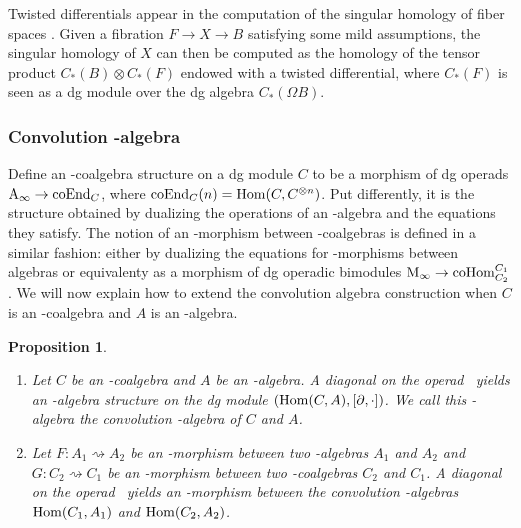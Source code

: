 \documentclass[twoside, 11pt]{amsart}
\newtheorem{proposition}[definition]{Proposition}
\theoremstyle{remark}
\begin{document}
Twisted differentials appear in the computation of the singular homology of fiber spaces \cite{Brown59}. 
Given a fibration $F \rightarrow X \rightarrow B$ satisfying some mild assumptions, the singular homology of $X$ can then be computed as the homology of the tensor product $C_*(B) \otimes C_*(F)$ endowed with a twisted differential, where $C_*(F)$ is seen as a dg module over the dg algebra $C_*(\Omega B)$.

\subsubsection{Convolution \Ainf -algebra} \label{sss:conv-ainf-alg}

Define an \Ainf -coalgebra structure on a dg module $C$ to be a morphism of dg operads $\mathrm{A}_\infty \rightarrow \mathrm{coEnd}_C$, where $\mathrm{coEnd}_C(n) = \mathrm{Hom} ( C , C^{\otimes n} )$. 
Put differently, it is the structure obtained by dualizing the operations of an \Ainf -algebra and the equations they satisfy.
The notion of an \Ainf -morphism between \Ainf -coalgebras is defined in a similar fashion: either by dualizing the equations for \Ainf -morphisms between \Ainf algebras or equivalenty as a morphism of dg operadic bimodules $\mathrm{M}_\infty \rightarrow \mathrm{coHom}^{C_1}_{C_2}$.
We will now explain how to extend the convolution algebra construction when $C$ is an \Ainf -coalgebra and $A$ is an \Ainf -algebra.

\begin{proposition} 
\label{prop:convolution-ainf} $ $
\begin{enumerate}[leftmargin=*]
    \item Let $C$ be an \Ainf -coalgebra and $A$ be an \Ainf -algebra. 
A diagonal on the operad \Ainf\ yields an \Ainf -algebra structure on the dg module $(\mathrm{Hom} (C,A) , [ \partial , \cdot ])$. 
We call this \Ainf -algebra the \emph{convolution \Ainf -algebra of $C$ and $A$}.
\item Let $F : A_1 \rightsquigarrow A_2$ be an \Ainf -morphism between two \Ainf -algebras $A_1$ and $A_2$ and $G : C_2 \rightsquigarrow C_1$ be an \Ainf -morphism between two \Ainf -coalgebras $C_2$ and $C_1$. A diagonal on the operad \Minf\ yields  an \Ainf -morphism between the convolution \Ainf -algebras $\mathrm{Hom} (C_1,A_1)$ and $\mathrm{Hom} (C_2,A_2)$. 
\end{enumerate}
\end{proposition}
\end{document}
